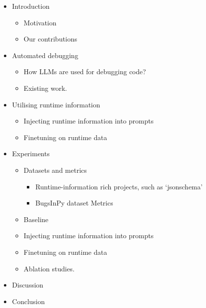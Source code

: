 
\begin{itemize}
  \item Introduction
    \begin{itemize}
        \item Motivation
        \item Our contributions
    \end{itemize}

  \item Automated debugging
  \begin{itemize}
    \item How LLMs are used for debugging code?
    \item Existing work.
  \end{itemize}

  \item Utilising runtime information
  \begin{itemize}
    \item Injecting runtime information into prompts
    \item Finetuning on runtime data
  \end{itemize}

  \item Experiments
  \begin{itemize}
    \item Datasets and metrics
    \begin{itemize}
      \item Runtime-information rich projects, such as `jsonschema'
      \item BugsInPy dataset
      \Item Metrics
    \end{itemize}
    \item Baseline
    \item Injecting runtime information into prompts
    \item Finetuning on runtime data
    \item Ablation studies.
  \end{itemize}

  \item Discussion

  \item Conclusion

\end{itemize}
